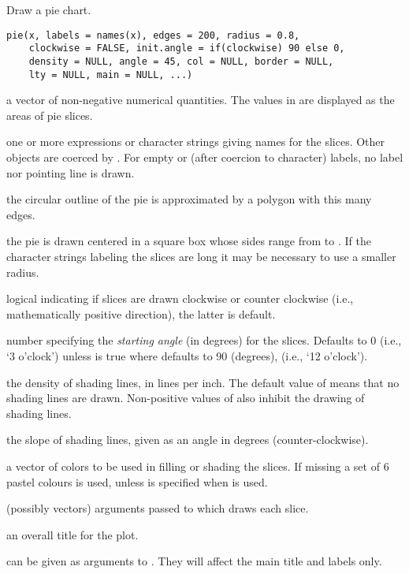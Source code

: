 %
\begin{Description}\relax
Draw a pie chart.
\end{Description}
%
\begin{Usage}
\begin{verbatim}
pie(x, labels = names(x), edges = 200, radius = 0.8,
    clockwise = FALSE, init.angle = if(clockwise) 90 else 0,
    density = NULL, angle = 45, col = NULL, border = NULL,
    lty = NULL, main = NULL, ...)
\end{verbatim}
\end{Usage}
%
\begin{Arguments}
\begin{ldescription}
\item[\code{x}] a vector of non-negative numerical quantities.
The values in  are displayed as the areas of pie slices.
\item[\code{labels}] one or more expressions or character strings giving
names for the slices.  Other objects are coerced by
.  For empty or 
(after coercion to character) labels, no label nor pointing line
is drawn.
\item[\code{edges}] the circular outline of the pie is approximated by a
polygon with this many edges.
\item[\code{radius}] the pie is drawn centered in a square box whose sides
range from  to .  If the character strings labeling
the slices are long it may be necessary to use a smaller radius.
\item[\code{clockwise}] logical indicating if slices are drawn clockwise or
counter clockwise (i.e., mathematically positive direction), the
latter is default.
\item[\code{init.angle}] number specifying the \emph{starting angle} (in
degrees) for the slices. Defaults to 0 (i.e., `3 o'clock')
unless  is true where 
defaults to 90 (degrees), (i.e., `12 o'clock').
\item[\code{density}] the density of shading lines, in lines per inch.
The default value of  means that no shading lines
are drawn. Non-positive values of  also inhibit the
drawing of shading lines.
\item[\code{angle}] the slope of shading lines, given as an angle in
degrees (counter-clockwise).
\item[\code{col}] a vector of colors to be used in filling or shading
the slices. If missing a set of 6 pastel colours is used,
unless  is specified when  is used.
\item[\code{border, lty}] (possibly vectors) arguments passed to
 which draws each slice.
\item[\code{main}] an overall title for the plot.
\item[\code{...}]  can be given as arguments to
.  They will affect the main title and labels only.
\end{ldescription}
\end{Arguments}
